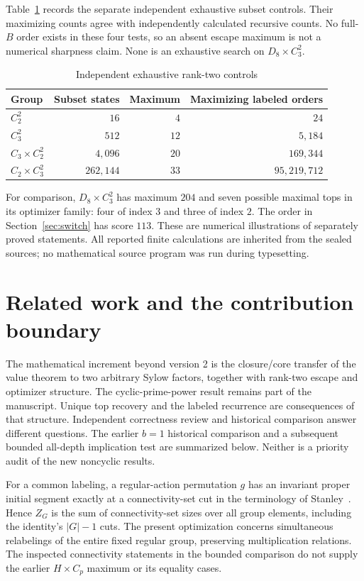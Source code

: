 \documentclass[11pt,letterpaper]{article}
\theoremstyle{definition}\newtheorem{definition}{Definition}
\begin{document}
Table~\ref{tab:rankcontrols} records the separate independent exhaustive subset controls. Their maximizing counts agree with independently calculated recursive counts. No full-$B$ order exists in these four tests, so an absent escape maximum is not a numerical sharpness claim. None is an exhaustive search on $D_8\times C_3^2$.
\begin{table}[htbp]\centering
\caption{Independent exhaustive rank-two controls}\label{tab:rankcontrols}
\begin{tabular}{lrrr}\toprule
Group & Subset states & Maximum & Maximizing labeled orders\\\midrule
$C_2^2$ & $16$ & $4$ & $24$\\
$C_3^2$ & $512$ & $12$ & $5{,}184$\\
$C_3\times C_2^2$ & $4{,}096$ & $20$ & $169{,}344$\\
$C_2\times C_3^2$ & $262{,}144$ & $33$ & $95{,}219{,}712$\\\bottomrule
\end{tabular}\end{table}
For comparison, $D_8\times C_3^2$ has maximum $204$ and seven possible maximal tops in its optimizer family: four of index $3$ and three of index $2$. The order in Section~\ref{sec:switch} has score $113$. These are numerical illustrations of separately proved statements. All reported finite calculations are inherited from the sealed sources; no mathematical source program was run during typesetting.

\section{Related work and the contribution boundary}\label{sec:related}
The mathematical increment beyond version 2 is the closure/core transfer of the value theorem to two arbitrary Sylow factors, together with rank-two escape and optimizer structure. The cyclic-prime-power result remains part of the manuscript. Unique top recovery and the labeled recurrence are consequences of that structure. Independent correctness review and historical comparison answer different questions. The earlier $b=1$ historical comparison and a subsequent bounded all-depth implication test are summarized below. Neither is a priority audit of the new noncyclic results.

For a common labeling, a regular-action permutation $g$ has an invariant proper initial segment exactly at a connectivity-set cut in the terminology of Stanley~\cite{stanley}. Hence $Z_G$ is the sum of connectivity-set sizes over all group elements, including the identity's $|G|-1$ cuts. The present optimization concerns simultaneous relabelings of the entire fixed regular group, preserving multiplication relations. The inspected connectivity statements in the bounded comparison do not supply the earlier $H\times C_p$ maximum or its equality cases.
\end{document}

